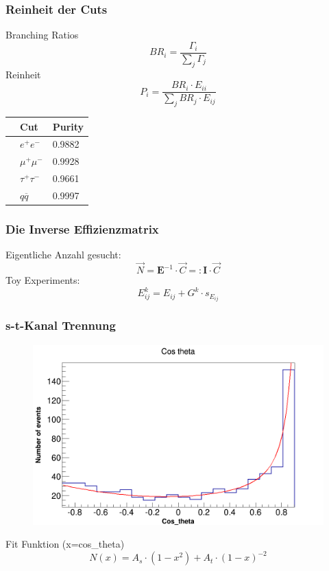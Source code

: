 \begin{frame}
	\frametitle{Reinheit der Cuts}
	\hspace{2cm} Branching Ratios
	\begin{equation*}
		BR_i=\frac{\Gamma_i}{\sum_{j}\Gamma_{j}}
	\end{equation*}
	\hspace{2cm} Reinheit
	\begin{equation*}
		P_i=\frac{BR_i\cdot E_{ii}}{\sum_{j}BR_j\cdot E_{ij}}
	\end{equation*}
	\begin{table}\centering
		\begin{tabular}{@{}lll@{}}
			\toprule
			&Cut&Purity\\
			\midrule
			&$e^+e^-$&0.9882\\
			&$\mu^+\mu^-$&0.9928\\
			&$\tau^+\tau^-$&0.9661\\
			&$q\overline{q}$&0.9997\\
			\bottomrule
		\end{tabular}
	\end{table}
\end{frame}

\begingroup
\Large
\begin{frame}
	\frametitle{Die Inverse Effizienzmatrix}
	\hspace{2cm} Eigentliche Anzahl gesucht:
	\begin{equation*}
		\vec{N}=\boldsymbol{E}^{-1}\cdot\vec{C}=:\boldsymbol{I}\cdot\vec{C}
	\end{equation*}
	\hspace{2cm} Toy Experiments:
	\begin{equation*}
		E^{k}_{ij}=E_{ij}+G^k\cdot s_{E_{ij}}
	\end{equation*}
\end{frame}
\endgroup

\begin{frame}
	\frametitle{s-t-Kanal Trennung}
	\begin{figure}
		\centering
		\includegraphics[width=0.85\linewidth]{../results/data_results/cosp_fits/stchannelexample46.png}
	\end{figure}
	\hspace{2cm} Fit Funktion (x=cos\_theta)
	\begin{equation*}
		N(x)=A_s\cdot(1-x^2)+A_t\cdot(1-x)^{-2}
	\end{equation*}
\end{frame}

